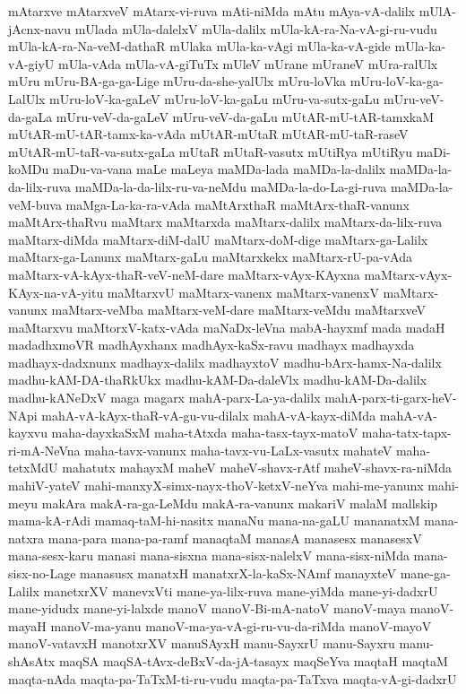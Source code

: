{mAtarxve
mAtarxveV
mAtarx-vi-ruva
mAti-niMda
mAtu
mAya-vA-dalilx
mUlA-jAcnx-navu
mUlada
mUla-dalelxV
mUla-dalilx
mUla-kA-ra-Na-vA-gi-ru-vudu
mUla-kA-ra-Na-veM-dathaR
mUlaka
mUla-ka-vAgi
mUla-ka-vA-gide
mUla-ka-vA-giyU
mUla-vAda
mUla-vA-giTuTx
mUleV
mUrane
mUraneV
mUra-ralUlx
mUru
mUru-BA-ga-ga-Lige
mUru-da-she-yalUlx
mUru-loVka
mUru-loV-ka-ga-LalUlx
mUru-loV-ka-gaLeV
mUru-loV-ka-gaLu
mUru-va-sutx-gaLu
mUru-veV-da-gaLa
mUru-veV-da-gaLeV
mUru-veV-da-gaLu
mUtAR-mU-tAR-tamxkaM
mUtAR-mU-tAR-tamx-ka-vAda
mUtAR-mUtaR
mUtAR-mU-taR-raseV
mUtAR-mU-taR-va-sutx-gaLa
mUtaR
mUtaR-vasutx
mUtiRya
mUtiRyu
maDi-koMDu
maDu-va-vana
maLe
maLeya
maMDa-lada
maMDa-la-dalilx
maMDa-la-da-lilx-ruva
maMDa-la-da-lilx-ru-va-neMdu
maMDa-la-do-La-gi-ruva
maMDa-la-veM-buva
maMga-La-ka-ra-vAda
maMtArxthaR
maMtArx-thaR-vanunx
maMtArx-thaRvu
maMtarx
maMtarxda
maMtarx-dalilx
maMtarx-da-lilx-ruva
maMtarx-diMda
maMtarx-diM-dalU
maMtarx-doM-dige
maMtarx-ga-Lalilx
maMtarx-ga-Lanunx
maMtarx-gaLu
maMtarxkekx
maMtarx-rU-pa-vAda
maMtarx-vA-kAyx-thaR-veV-neM-dare
maMtarx-vAyx-KAyxna
maMtarx-vAyx-KAyx-na-vA-yitu
maMtarxvU
maMtarx-vanenx
maMtarx-vanenxV
maMtarx-vanunx
maMtarx-veMba
maMtarx-veM-dare
maMtarx-veMdu
maMtarxveV
maMtarxvu
maMtorxV-katx-vAda
maNaDx-leVna
mabA-hayxmf
mada
madaH
madadhxmoVR
madhAyxhanx
madhAyx-kaSx-ravu
madhayx
madhayxda
madhayx-dadxnunx
madhayx-dalilx
madhayxtoV
madhu-bArx-hamx-Na-dalilx
madhu-kAM-DA-thaRkUkx
madhu-kAM-Da-daleVlx
madhu-kAM-Da-dalilx
madhu-kANeDxV
maga
magarx
mahA-parx-La-ya-dalilx
mahA-parx-ti-garx-heV-NApi
mahA-vA-kAyx-thaR-vA-gu-vu-dilalx
mahA-vA-kayx-diMda
mahA-vA-kayxvu
maha-dayxkaSxM
maha-tAtxda
maha-tasx-tayx-matoV
maha-tatx-tapx-ri-mA-NeVna
maha-tavx-vanunx
maha-tavx-vu-LaLx-vasutx
mahateV
maha-tetxMdU
mahatutx
mahayxM
maheV
maheV-shavx-rAtf
maheV-shavx-ra-niMda
mahiV-yateV
mahi-manxyX-simx-nayx-thoV-ketxV-neYva
mahi-me-yanunx
mahi-meyu
makAra
makA-ra-ga-LeMdu
makA-ra-vanunx
makariV
malaM
mallskip
mama-kA-rAdi
mamaq-taM-hi-nasitx
manaNu
mana-na-gaLU
mananatxM
mana-natxra
mana-para
mana-pa-ramf
manaqtaM
manasA
manasesx
manasesxV
mana-sesx-karu
manasi
mana-sisxna
mana-sisx-nalelxV
mana-sisx-niMda
mana-sisx-no-Lage
manasusx
manatxH
manatxrX-la-kaSx-NAmf
manayxteV
mane-ga-Lalilx
manetxrXV
manevxVti
mane-ya-lilx-ruva
mane-yiMda
mane-yi-dadxrU
mane-yidudx
mane-yi-lalxde
manoV
manoV-Bi-mA-natoV
manoV-maya
manoV-mayaH
manoV-ma-yanu
manoV-ma-ya-vA-gi-ru-vu-da-riMda
manoV-mayoV
manoV-vatavxH
manotxrXV
manuSAyxH
manu-SayxrU
manu-Sayxru
manu-shAsAtx
maqSA
maqSA-tAvx-deBxV-da-jA-tasayx
maqSeYva
maqtaH
maqtaM
maqta-nAda
maqta-pa-TaTxM-ti-ru-vudu
maqta-pa-TaTxva
maqta-vA-gi-dadxrU
}
